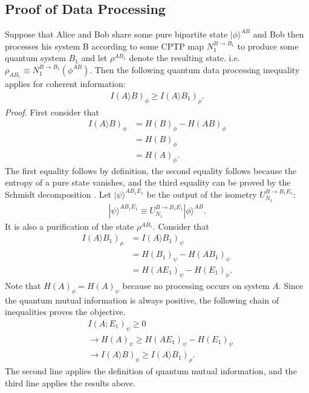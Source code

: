 \subsection{Proof of Data Processing}\label{sec:pfDataProcess}
Suppose that Alice and Bob share some pure bipartite state $|\phi \rangle ^{AB}$ and 
Bob then processes his system B according to some CPTP map $N_1^{B\to B_1}$ to produce some quantum system $B_1$ and let $\rho ^{AB_1}$ denote the resulting state. i.e.
$\rho_{AB_1} \equiv N_1^{B\to B_1}(\phi ^{AB})$. Then the following quantum data processing inequality applies for coherent information:
\begin{align}
I(A\rangle B)_{\phi} \geq I(A\rangle B_1)_{\rho}.
\end{align}
\textit{Proof.} First consider that
\begin{align}
I(A\rangle B)_{\phi} &= H(B)_\phi -H(AB)_\phi \nonumber \\
&=H(B)_\phi \nonumber \\
&=H(A)_\phi.
\end{align}
The first equality follows by definition, the second equality follows because the entropy of a pure state vanishes, and the third equality can be proved by the Schmidt decomposition \cite{CtoQ}. Let $|\psi \rangle ^{AB_1E_1}$ be the output of the isometry $U_{N_1}^{B \to B_1E_1}$:
\begin{align}
|\psi \rangle ^{AB_1E_1} \equiv U_{N_1}^{B \to B_1E_1}|\phi \rangle ^{AB}.
\end{align}
It is also a purification of the state $\rho ^{AB_1}$. Consider that
\begin{align}
I(A \rangle B_1)_\rho &= I(A \rangle B_1)_\psi \nonumber \\
&=H(B_1)_\psi - H(AB_1)_\psi \nonumber \\
&=H(AE_1)_\psi - H(E_1)_\psi.
\end{align}
Note that $H(A)_\phi = H(A)_\psi$ because no processing occurs on system $A$. Since the quantum mutual information is always positive, the following chain of inequalities proves the objective.
\begin{align}
&I(A;E_1)_\psi \geq 0 \nonumber \\
&\rightarrow H(A)_\psi \geq H(AE_1)_\psi - H(E_1)_\psi \nonumber \\
&\rightarrow I(A\rangle B)_\phi \geq I(A\rangle B_1)_\rho.
\end{align}
The second line applies the definition of quantum mutual information, and the third line applies the results above.